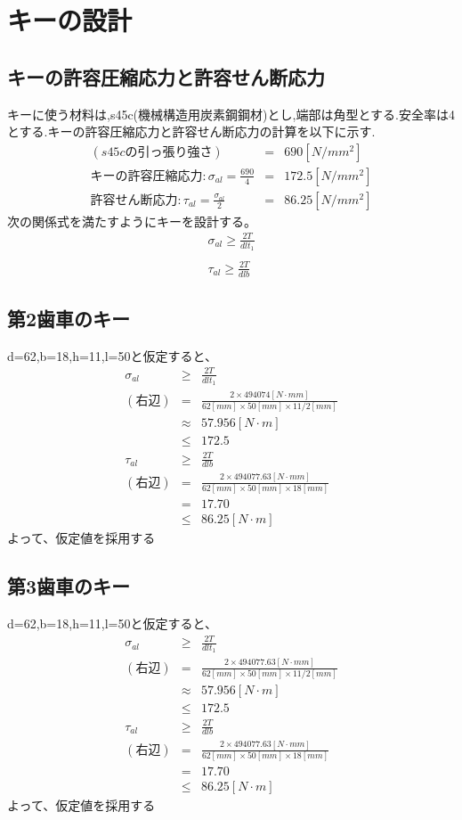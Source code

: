 \section{キーの設計}
\subsection{キーの許容圧縮応力と許容せん断応力}
キーに使う材料は,s45c(機械構造用炭素鋼鋼材)とし,端部は角型とする.安全率は4とする.キーの許容圧縮応力と許容せん断応力の計算を以下に示す.
\begin{eqnarray}
(s45cの引っ張り強さ)&=&690[N/mm^2]\\
キーの許容圧縮応力:\sigma_{al} = \frac{690}{4} &=& 172.5[N/mm^2]\\
許容せん断応力:\tau_{al}=\frac{\sigma_{al}}{2} &=& 86.25[N/mm^2]
\end{eqnarray}
次の関係式を満たすようにキーを設計する。
\begin{eqnarray}
\sigma_{al} \geq \frac{2T}{dlt_1}\\
\nonumber\\
\tau_{al} \geq \frac{2T}{dlb}
\end{eqnarray}
\subsection{第2歯車のキー}
d=62,b=18,h=11,l=50と仮定すると、
\begin{eqnarray}
\sigma_{al} &\geq& \frac{2T}{dlt_1}\\
(右辺) &=& \frac{2 \times 494074[N \cdot mm]}{62[mm] \times 50[mm] \times 11/2[mm]}\\
       &\approx&57.956[N \cdot m]\\
       &\leq& 172.5\\
\tau_{al} &\geq& \frac{2T}{dlb}\\
(右辺) &=& \frac{2 \times 494077.63[N \cdot mm]}{62[mm] \times 50[mm] \times 18[mm]}\\
       &=& 17.70\\
       &\leq&86.25[N \cdot m]
\end{eqnarray}
よって、仮定値を採用する
\subsection{第3歯車のキー}
d=62,b=18,h=11,l=50と仮定すると、
\begin{eqnarray}
\sigma_{al} &\geq& \frac{2T}{dlt_1}\\
(右辺) &=& \frac{2 \times 494077.63[N \cdot mm]}{62[mm] \times 50[mm] \times 11/2[mm]}\\
       &\approx&57.956[N \cdot m]\\
       &\leq& 172.5\\
\tau_{al} &\geq& \frac{2T}{dlb}\\
(右辺) &=& \frac{2 \times 494077.63[N \cdot mm]}{62[mm] \times 50[mm] \times 18[mm]}\\
       &=& 17.70\\
       &\leq&86.25[N \cdot m]
\end{eqnarray}
よって、仮定値を採用する

